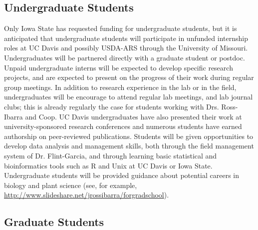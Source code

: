 \renewcommand{\thepage}{Plans for Undergraduate and Graduate Student Mentoring  - Page \arabic{page} of 1}

\subsection*{Undergraduate Students}

Only Iowa State has requested funding for undergraduate students, but it is anticipated that undergraduate students will participate in unfunded internship roles at UC Davis and possibly USDA-ARS through the University of Missouri. Undergraduates will  be partnered directly with a graduate student or postdoc. Unpaid undergraduate interns will be expected to develop specific research projects, and are expected to present on the progress of their work during regular group meetings.
In addition to research experience in the lab or in the field, undergraduates will be encourage to attend regular lab meetings, and lab journal clubs; this is already regularly the case for students working with Drs. Ross-Ibarra and Coop.  UC Davis undergraduates have also presented their work at university-sponsored research conferences and numerous students have earned authorship on peer-reviewed publications.  Students will be given opportunities to develop data analysis and management skills, both through the field management system of Dr. Flint-Garcia, and through learning basic statistical and bioinformatics tools such as R and Unix at UC Davis or Iowa State. 
Undergraduate students will be provided guidance about potential careers in biology and plant science (see, for example, \url{http://www.slideshare.net/jrossibarra/forgradschool}).  

\subsection*{Graduate Students}

